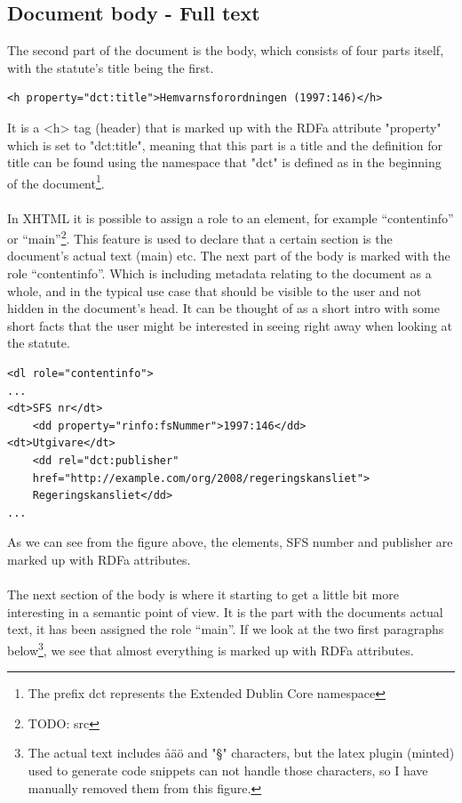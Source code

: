\subsection{Document body - Full text}
The second part of the document is the body, which consists of four parts itself, with the statute's title being the first.\\
\begin{verbatim}
<h property="dct:title">Hemvarnsforordningen (1997:146)</h>
\end{verbatim}
\linebreak
It is a <h> tag (header) that is marked up with the RDFa attribute "property" which is set to "dct:title", meaning that this part is a title and the definition for title can be found using the namespace that "dct" is defined as in the beginning of the document\footnote{The prefix dct represents the Extended Dublin Core namespace}.\\\\
In XHTML it is possible to assign a role to an element, for example “contentinfo” or “main”\footnote{TODO: src}. This feature is used to declare that a certain section is the document’s actual text (main) etc. The next part of the body is marked with the role “contentinfo”. Which is including metadata relating to the document as a whole, and in the typical use case that should be visible to the user and not hidden in the document’s head. It can be thought of as a short intro with some short facts that the user might be interested in seeing right away when looking at the statute.\\
\begin{verbatim}
<dl role="contentinfo">
...
<dt>SFS nr</dt>
    <dd property="rinfo:fsNummer">1997:146</dd>
<dt>Utgivare</dt>
    <dd rel="dct:publisher" 
	href="http://example.com/org/2008/regeringskansliet">
	Regeringskansliet</dd>
...
\end{verbatim}
\linebreak
\newline
As we can see from the figure above, the elements, SFS number and publisher are marked up with RDFa attributes.\\\\
The next section of the body is where it starting to get a little bit more interesting in a semantic point of view. It is the part with the documents actual text, it has been assigned the role “main”. If we look at the two first paragraphs below\footnote{The actual text includes åäö and "§" characters, but the latex plugin (minted) used to generate code snippets can not handle those characters, so I have manually removed them from this figure.}, we see that almost everything is marked up with RDFa attributes.\\
